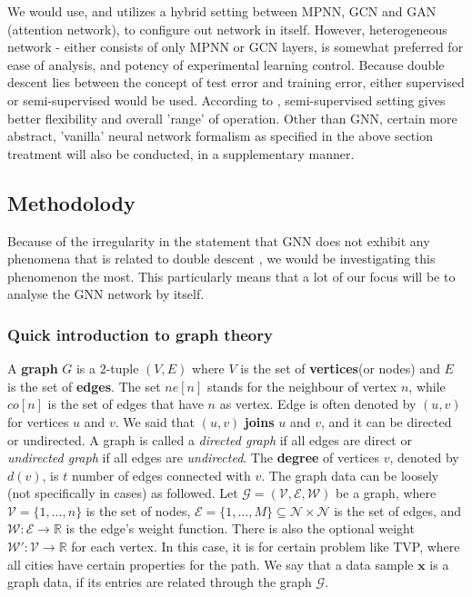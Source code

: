 \documentclass[10pt,oneside,oldfontcommands,dvipsnames,article]{memoir}
\begin{document}
We would use, and utilizes a hybrid setting between MPNN, GCN and GAN (attention network), to configure out network in itself. However, heterogeneous network - either consists of only MPNN or GCN layers, is somewhat preferred for ease of analysis, and potency of experimental learning control. Because double descent lies between the concept of test error and training error, either supervised or semi-supervised would be used. According to \cite{shi2024homophilymodulatesdoubledescent}, semi-supervised setting gives better flexibility and overall 'range' of operation. Other than GNN, certain more abstract, 'vanilla' neural network formalism as specified in the above section treatment will also be conducted, in a supplementary manner. 

\subsection{Methodolody}

Because of the irregularity in the statement that GNN does not exhibit any phenomena that is related to double descent \cite{shi2024homophilymodulatesdoubledescent}, we would be investigating this phenomenon the most. This particularly means that a lot of our focus will be to analyse the GNN network by itself. 

\subsubsection{Quick introduction to graph theory}

A \textbf{graph} $G$ is a 2-tuple $(V,E)$ where $V$ is the set of \textbf{vertices}(or nodes) and $E$ is the set of \textbf{edges}. The set $ne[n]$ stands for the neighbour of vertex $n$, while $co[n]$ is the set of edges that have $n$ as vertex. Edge is often denoted by $(u,v)$ for vertices $u$ and $v$. We said that $(u,v)$ \textbf{joins} $u$ and $v$, and it can be directed or undirected. A graph is called a \textit{directed graph} if all edges are direct or \textit{undirected graph} if all edges are \textit{undirected}. The \textbf{degree} of vertices $v$, denoted by $d(v)$, is $t$ number of edges connected with $v$.
The graph data can be loosely (not specifically in cases) as followed. Let $\mathcal{G}=(\mathcal{V},\mathcal{E},\mathcal{W})$ be a graph, where $\mathcal{V}=\{1,\dots,n\}$ is the set of nodes, $\mathcal{E}=\{1,\dots,M\}\subseteq \mathcal{N}\times \mathcal{N}$ is the set of edges, and $\mathcal{W}: \mathcal{E}\to \mathbb{R}$ is the edge's weight function. There is also the optional weight $\mathcal{W}': \mathcal{V}\to \mathbb{R}$ for each vertex. In this case, it is for certain problem like TVP, where all cities have certain properties for the path. We say that a data sample $\mathbf{x}$ is a graph data, if its entries are related through the graph $\mathcal{G}$. 
\end{document}
